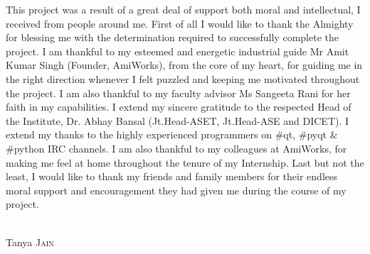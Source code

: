 \begin{acknowledgements}

This project was a result of a great deal of support both moral and intellectual, I received from people around me. First of all I would like to thank the Almighty for blessing me with the determination required to successfully complete the project. I am thankful to my esteemed and energetic industrial guide Mr Amit Kumar Singh (Founder, AmiWorks), from the core of my heart, for guiding me in the right direction whenever I felt puzzled and keeping me motivated throughout the project. I am also thankful to my faculty advisor Ms Sangeeta Rani for her faith in my capabilities. I extend my sincere gratitude to the respected Head of the Institute, Dr. Abhay Bansal (Jt.Head-ASET, Jt.Head-ASE and DICET). I extend my thanks to the highly experienced programmers on \#qt, \#pyqt \& \#python IRC channels. I am also thankful to my colleagues at AmiWorks, for making me feel at home throughout the tenure of my Internship. Last but not the least, I would like to thank my friends and family members for their endless moral support and encouragement they had given me during the course of my project. 

\begin{flushright}
  \textsc{}\\[1.0cm]
  Tanya \textsc{Jain}
\end{flushright}

\end{acknowledgements}
